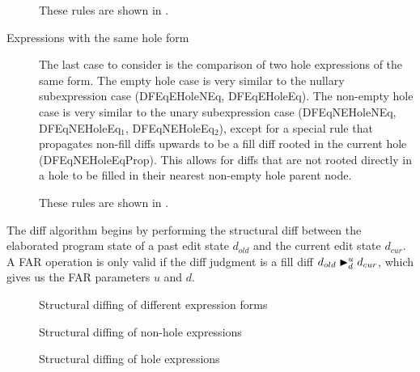 \begin{description}
  These rules are shown in .

\item[Expressions with the same hole form] The last case to consider is the comparison of two hole expressions of the same form. The empty hole case is very similar to the nullary subexpression case (DFEqEHoleNEq, DFEqEHoleEq). The non-empty hole case is very similar to the unary subexpression case (DFEqNEHoleNEq, DFEqNEHoleEq$_1$, DFEqNEHoleEq$_2$), except for a special rule that propagates non-fill diffs upwards to be a fill diff rooted in the current hole (DFEqNEHoleEqProp). This allows for diffs that are not rooted directly in a hole to be filled in their nearest non-empty hole parent node.

  These rules are shown in .
\end{description}
The diff algorithm begins by performing the structural diff between the elaborated program state of a past edit state $d_{old}$ and the current edit state $d_{cur}$. A FAR operation is only valid if the diff judgment is a fill diff $\fdiff{d_{old}}{d_{cur}}{u}{d}$, which gives us the FAR parameters $u$ and $d$.

\begin{figure}
  \centering
  \begin{mdframed}
    \begin{singlespace}
      
    \end{singlespace}
  \end{mdframed}
  \caption{Structural diffing of different expression forms}
  \label{fig:structural-diff-diff}
\end{figure}

\begin{figure}
  \centering
  \begin{mdframed}
    \begin{singlespace}
      
    \end{singlespace}
  \end{mdframed}
  \caption{Structural diffing of non-hole expressions}
  \label{fig:structural-diff-non-holes}
\end{figure}

\begin{figure}
  \centering
  \begin{mdframed}
    \begin{singlespace}
      
    \end{singlespace}
  \end{mdframed}
  \caption{Structural diffing of hole expressions}
  \label{fig:structural-diff-holes}
\end{figure}


